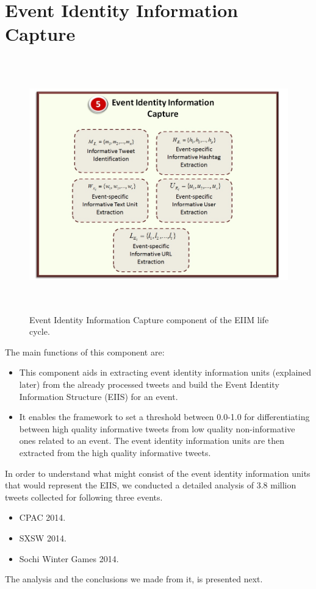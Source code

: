 \section{Event Identity Information Capture\label{infocapture}}

\begin{figure}[htbp]
  \caption{Event Identity Information Capture component of the EIIM life cycle.}
  \centering
    \includegraphics[width=14cm,height=11cm]{Figures/EIIMComponents/EventIdentityInformationCapture.jpg}
\end{figure}

The main functions of this component are:
\begin{itemize}
\item This component aids in extracting event identity information units (explained later) from the already processed tweets and build the Event Identity Information Structure (EIIS) for an event.
\item It enables the framework to set a threshold between 0.0-1.0 for differentiating between high quality informative tweets from low quality non-informative ones related to an event. The event identity information units are then extracted from the high quality informative tweets.
\end{itemize}
  
In order to understand what might consist of the event identity information units that would represent the EIIS, we conducted a detailed analysis of 3.8 million tweets collected for following three events. 
\begin{itemize}
\item CPAC 2014.
\item SXSW 2014.
\item Sochi Winter Games 2014.
\end{itemize}
The analysis and the conclusions we made from it, is presented next.

